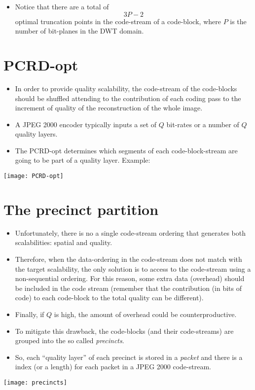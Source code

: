 \newpage
\begin{itemize}
\item Notice that there are a total of
  \begin{equation}
    3P-2
  \end{equation}
  optimal truncation points in the code-stream of a code-block, where
  $P$ is the number of bit-planes in the DWT domain.
\end{itemize}

\section*{PCRD-opt}
\begin{itemize}
\item In order to provide quality scalability, the code-stream of the
  code-blocks should be shuffled attending to the contribution of each
  coding pass to the increment of quality of the reconstruction of the
  whole image.
\item A JPEG 2000 encoder typically inputs a set of $Q$ bit-rates or a
  number of $Q$ quality layers.
\item The PCRD-opt determines which segments of each code-block-stream
  are going to be part of a quality layer. Example:
\end{itemize}
\begin{center}
  \texttt{[image: PCRD-opt]}
\end{center}

\section*{The precinct partition}
\begin{itemize}
\item Unfortunately, there is no a single code-stream ordering that
  generates both scalabilities: spatial and quality.
\item Therefore, when the data-ordering in the code-stream does not
  match with the target scalability, the only solution is to access to
  the code-stream using a non-sequential ordering. For this reason,
  some extra data (overhead) should be included in the code stream
  (remember that the contribution (in bits of code) to each code-block
  to the total quality can be different).
\item Finally, if $Q$ is high, the amount of overhead could be
  counterproductive.
\item To mitigate this drawback, the code-blocks (and their
  code-streams) are grouped into the so called \emph{precincts}.
\item So, each ``quality layer'' of each precinct is stored in a
  \emph{packet} and there is a index (or a length) for each packet in
  a JPEG 2000 code-stream.
\end{itemize}
\begin{center}
  \texttt{[image: precincts]}
\end{center}


